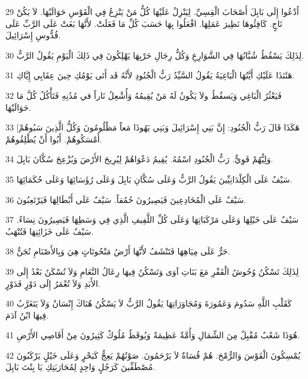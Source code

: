 \par 29 اُدْعُوا إِلَى بَابِلَ أَصْحَابَ الْقِسِيِّ. لِيَنْزِلْ عَلَيْهَا كُلُّ مَنْ يَنْزِعُ فِي الْقَوْسِ حَوَالَيْهَا. لاَ يَكُنْ نَاجٍ. كَافِئُوهَا نَظِيرَ عَمَلِهَا. افْعَلُوا بِهَا حَسَبَ كُلِّ مَا فَعَلَتْ. لأَنَّهَا بَغَتْ عَلَى الرَّبِّ عَلَى قُدُّوسِ إِسْرَائِيلَ.
\par 30 لِذَلِكَ يَسْقُطُ شُبَّانُهَا فِي الشَّوَارِعِ وَكُلُّ رِجَالِ حَرْبِهَا يَهْلِكُونَ فِي ذَلِكَ الْيَوْمِ يَقُولُ الرَّبُّ.
\par 31 هَئَنَذَا عَلَيْكِ أَيَّتُهَا الْبَاغِيَةُ يَقُولُ السَّيِّدُ رَبُّ الْجُنُودِ لأَنَّهُ قَد أَتَى يَوْمُكِ حِينَ عِقَابِي إِيَّاكِ.
\par 32 فَيَعْثُرُ الْبَاغِي وَيَسقُطُ ولاَ يَكُونُ لَهُ مَنْ يُقِيمُهُ وَأُشْعِلُ نَاراً في مُدُنِهِ فَتَأْكُلُ كُلَّ مَا حَوَالَيْهَا.
\par 33 [هَكَذَا قَالَ رَبُّ الْجُنُودِ: إِنَّ بَنِي إِسْرَائِيلَ وَبَنِي يَهُوذَا مَعاً مَظْلُومُونَ وَكُلُّ الَّذِينَ سَبُوهُمْ أَمْسَكُوهُمْ. أَبُوا أَنْ يُطْلِقُوهُمْ.
\par 34 وَلِيُّهُمْ قَوِيٌّ. رَبُّ الْجُنُودِ اسْمُهُ. يُقِيمُ دَعْوَاهُمْ لِيُرِيحَ الأَرْضَ وَيُزْعِجَ سُكَّانَ بَابِلَ.
\par 35 سَيْفٌ عَلَى الْكِلْدَانِيِّينَ يَقُولُ الرَّبُّ وَعَلَى سُكَّانِ بَابِلَ وَعَلَى رُؤَسَائِهَا وَعَلَى حُكَمَائِهَا.
\par 36 سَيْفٌ عَلَى الْمُخَادِعِينَ فَيَصِيرُونَ حُمُقاً. سَيْفٌ عَلَى أَبْطَالِهَا فَيَرْتَعِبُونَ.
\par 37 سَيْفٌ عَلَى خَيْلِهَا وَعَلَى مَرْكَبَاتِهَا وَعَلَى كُلِّ اللَّفِيفِ الَّذِي فِي وَسَطِهَا فَيَصِيرُونَ نِسَاءً. سَيْفٌ عَلَى خَزَائِنِهَا فَتُنْهَبُ.
\par 38 حَرٌّ عَلَى مِيَاهِهَا فَتَنْشَفُ لأَنَّهَا أَرْضُ مَنْحُوتَاتٍ هِيَ وَبِالأَصْنَامِ تُجَنُّ.
\par 39 لِذَلِكَ تَسْكُنُ وُحُوشُ الْقَفْرِ مَعَ بَنَاتِ آوَى وَتَسْكُنُ فِيهَا رِعَالُ النَّعَامِ وَلاَ تُسْكَنُ بَعْدُ إِلَى الأَبَدِ وَلاَ تُعْمَرُ إِلَى دَوْرٍ فَدَوْرٍ.
\par 40 كَقَلْبِ اللَّهِ سَدُومَ وَعَمُورَةَ وَمُجَاوَرَاتِهَا يَقُولُ الرَّبُّ لاَ يَسْكُنُ هُنَاكَ إِنْسَانٌ وَلاَ يَتَغَرَّبُ فِيهَا ابْنُ آدَمَ.
\par 41 هُوَذَا شَعْبٌ مُقْبِلٌ مِنَ الشِّمَالِ وَأُمَّةٌ عَظِيمَةٌ وَيُوقَظُ مُلُوكٌ كَثِيرُونَ مِنْ أَقَاصِي الأَرْضِ.
\par 42 يُمْسِكُونَ الْقَوْسَ وَالرُّمْحَ. هُمْ قُسَاةٌ لاَ يَرْحَمُونَ. صَوْتُهُمْ يَعِجُّ كَبَحْرٍ وَعَلَى خَيْلٍ يَرْكَبُونَ مُصْطَفِّينَ كَرَجُلٍ وَاحِدٍ لِمُحَارَبَتِكِ يَا بِنْتَ بَابِلَ.
